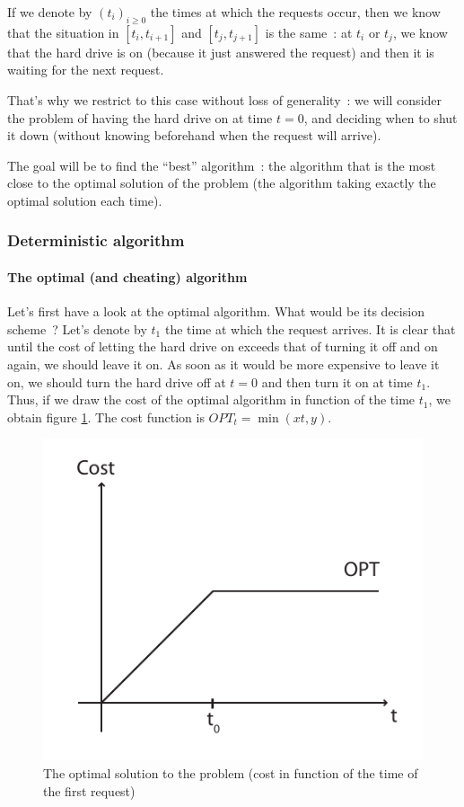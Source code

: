 If we denote by $(t_i)_{i \geq 0}$ the times at which the requests occur, then we know that the situation in $[t_i, t_{i+1}]$ and $[t_j, t_{j+1}]$ is the same~: at $t_i$ or $t_j$, we know that the hard drive is on (because it just answered the request) and then it is waiting for the next request.

That's why we restrict to this case without loss of generality~: we will consider the problem of having the hard drive on at time $t = 0$, and deciding when to shut it down (without knowing beforehand when the request will arrive).

The goal will be to find the ``best'' algorithm~: the algorithm that is the most close to the optimal solution of the problem (the algorithm taking exactly the optimal solution each time).


\subsubsection{Deterministic algorithm}

\paragraph{The optimal (and cheating) algorithm}

Let's first have a look at the optimal algorithm. What would be its decision scheme~? Let's denote by $t_1$ the time at which the request arrives. It is clear that until the cost of letting the hard drive on exceeds that of turning it off and on again, we should leave it on. As soon as it would be more expensive to leave it on, we should turn the hard drive off at $t = 0$ and then turn it on at time $t_1$. Thus, if we draw the cost of the optimal algorithm in function of the time $t_1$, we obtain figure \ref{fig1}. The cost function is $OPT_t = \min (x t, y)$.
\begin{figure}
	\center \includegraphics{Figures/Fig1}
	\caption{The optimal solution to the problem (cost in function of the time of the first request)} \label{fig1}
\end{figure}

